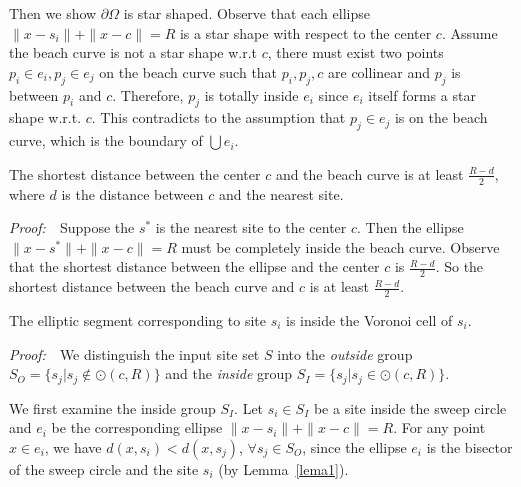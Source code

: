 {{%
Then we show $\partial \Omega$ is star shaped. Observe that each
ellipse $\|x-s_i\|+\|x-c\|=R$ is a star shape with respect to the
center $c$. Assume the beach curve is not a star shape w.r.t $c$,
there must exist two points $p_i\in e_i,p_j\in e_j$ on the beach
curve such that $p_i,p_j,c$ are collinear and $p_j$ is between $p_i$
and $c$. Therefore, $p_j$ is totally inside $e_i$ since $e_i$ itself
forms a star shape w.r.t. $c$. This contradicts to the assumption
that $p_j\in e_j$ is on the beach curve, which is the boundary of
$\bigcup e_i$.

\vspace{0.1in}
\begin{lemma}\label{lema4_1}
The shortest distance between the center $c$ and the beach curve is
at least $\frac{R-d}{2}$, where $d$ is the distance between $c$ and
the nearest site.
\end{lemma}
\vspace{0.1in}\noindent\textit{Proof:}~~Suppose the $s^{*}$ is the
nearest site to the center $c$. Then the ellipse
$\|x-s^{*}\|+\|x-c\|=R$ must be completely inside the beach curve.
Observe that the shortest distance between the ellipse and the
center $c$ is $\frac{R-d}{2}$. So the shortest distance between the
beach curve and $c$ is at least $\frac{R-d}{2}$.

\vspace{0.1in}
\begin{lemma}\label{lema4}
The elliptic segment corresponding to site $s_i$ is inside the
Voronoi cell of $s_i$.
\end{lemma}
\vspace{0.1in}\noindent\textit{Proof:}~~We distinguish the input
site set $S$ into the \textit{outside} group $S_O=\{s_j|s_j
\notin\odot(c,R)\}$ and the \textit{inside} group
$S_I=\{s_j|s_j\in\odot(c,R)\}$.

We first examine the inside group $S_I$. Let $s_i\in S_I$ be a site
inside the sweep circle and $e_i$ be the corresponding ellipse
$\|x-s_i\|+\|x-c\|=R$. For any point $x\in e_i$, we have
$d(x,s_i)<d(x,s_j)$, $\forall s_j\in S_O$, since the ellipse $e_i$
is the bisector of the sweep circle and the site $s_i$ (by
Lemma~\ref{lema1}).

}}
